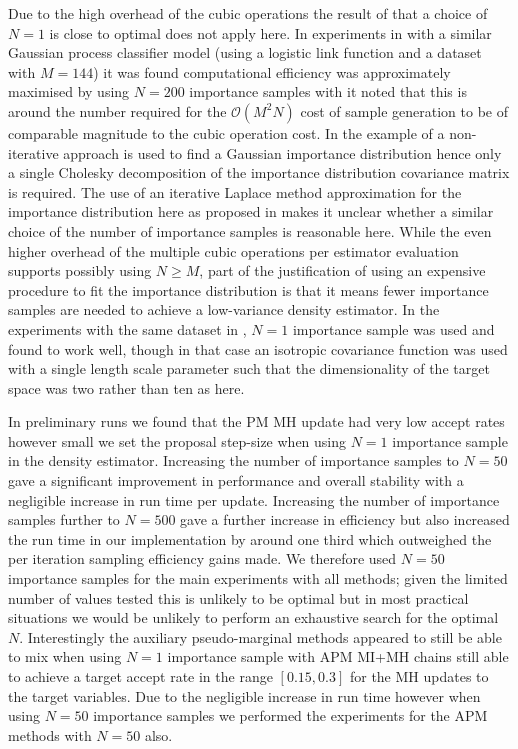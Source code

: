 Due to the high overhead of the cubic operations the result of \citep{sherlock2016pseudo} that a choice of $N=1$ is close to optimal does not apply here. In experiments in \citep{sherlock2016pseudo} with a similar Gaussian process classifier model (using a logistic link function and a dataset with $M=144$) it was found computational efficiency was approximately maximised by using $N=200$ importance samples with it noted that this is around the number required for the $\mathcal{O}(M^2 N)$ cost of sample generation to be of comparable magnitude to the cubic operation cost. In the example of \citep{sherlock2016pseudo} a non-iterative approach is used to find a Gaussian importance distribution hence only a single Cholesky decomposition of the importance distribution covariance matrix is required. The use of an iterative Laplace method approximation for the importance distribution here as proposed in \citep{filippone2014pseudo} makes it unclear whether a similar choice of the number of importance samples is reasonable here. While the even higher overhead of the multiple cubic operations per estimator evaluation supports possibly using $N \geq M$, part of the justification of using an expensive procedure to fit the importance distribution is that it means fewer importance samples are needed to achieve a low-variance density estimator. In the experiments with the same dataset in \citep{filippone2014pseudo}, $N=1$ importance sample was used and found to work well, though in that case an isotropic covariance function was used with a single length scale parameter such that the dimensionality of the target space was two rather than ten as here.

In preliminary runs we found that the \ac{PM} \ac{MH} update had very low accept rates however small we set the proposal step-size when using $N=1$ importance sample in the density estimator. Increasing the number of importance samples to $N=50$ gave a significant improvement in performance and overall stability with a negligible increase in run time per update. Increasing the number of importance samples further to $N=500$ gave a further increase in efficiency but also increased the run time in our implementation by around one third which outweighed the per iteration sampling efficiency gains made. We therefore used $N=50$ importance samples for the main experiments with all methods; given the limited number of values tested this is unlikely to be optimal but in most practical situations we would be unlikely to perform an exhaustive search for the optimal $N$. Interestingly the auxiliary pseudo-marginal methods appeared to still be able to mix when using $N=1$ importance sample with \ac{APM} \ac{MI}+\ac{MH} chains still able to achieve a target accept rate in the range $[0.15,0.3]$ for the \ac{MH} updates to the target variables. Due to the negligible increase in run time however when using $N=50$ importance samples we performed the experiments for the \ac{APM} methods with $N=50$ also.

